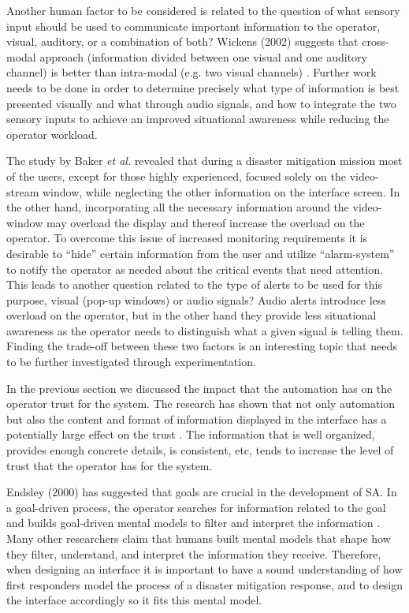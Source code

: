 \documentclass[12pt, letterpaper, oneside]{article}
\begin{document}
Another human factor to be considered is related to the question of what sensory input should be used to communicate important information to the operator, visual, auditory, or a combination of both? Wickens (2002) suggests that cross-modal approach (information divided between one visual and one auditory channel) is better than intra-modal (e.g. two visual channels) \cite{3}. Further work needs to be done in order to determine precisely what type of information is best presented visually and what through audio signals, and how to integrate the two sensory inputs to achieve an improved situational awareness while reducing the operator workload. 

The study by Baker \emph{et al.} revealed that during a disaster mitigation mission most of the users, except for those highly experienced, focused solely on the video-stream window, while neglecting the other information on the interface screen. In the other hand, incorporating all the necessary information around the video-window may overload the display and thereof increase the overload on the operator. To overcome this issue of increased monitoring requirements it is desirable to “hide” certain information from the user and utilize “alarm-system” to notify the operator as needed about the critical events that need attention. This leads to another question related to the type of alerts to be used for this purpose, visual (pop-up windows) or audio signals? Audio alerts introduce less overload on the operator, but in the other hand they provide less situational awareness as the operator needs to distinguish what a given signal is telling them. Finding the trade-off between these two factors is an interesting topic that needs to be further investigated through experimentation. 

In the previous section we discussed the impact that the automation has on the operator trust for the system. The research has shown that not only automation but also the content and format of information displayed in the interface has a potentially large effect on the trust \cite{1, 2}. The information that is well organized, provides enough concrete details, is consistent, etc, tends to increase the level of trust that the operator has for the system.  

Endsley (2000) has suggested that goals are crucial in the development of SA. In a goal-driven process, the operator searches for information related to the goal and builds goal-driven mental models to filter and interpret the information \cite{26}. Many other researchers claim that humans built mental models that shape how they filter, understand, and interpret the information they receive. Therefore, when designing an interface it is important to have a sound understanding of how first responders model the process of a disaster mitigation response, and to design the interface accordingly so it fits this mental model. 
\end{document}
